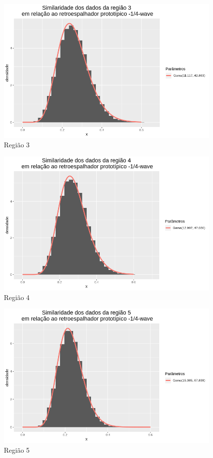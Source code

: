 \documentclass[12pt]{article}
\begin{document}
\begin{figure}[!h]
    \centering
    \vspace{0.1\linewidth}
    \includegraphics[width = \linewidth]{../../Images/Report_18_12_20/nwv_region3.png}
    \caption{Região 3}
    \label{fig:nwv_r3}
\end{figure}

\begin{figure}[!h]
    \centering
    \vspace{0.1\linewidth}
    \includegraphics[width = \linewidth]{../../Images/Report_18_12_20/nwv_region4.png}
    \caption{Região 4}
    \label{fig:nwv_r4}
\end{figure}

\begin{figure}[!h]
    \centering
    \vspace{0.1\linewidth}
    \includegraphics[width = \linewidth]{../../Images/Report_18_12_20/nwv_region5.png}
    \caption{Região 5}
    \label{fig:nwv_r5}
\end{figure}
\end{document}
